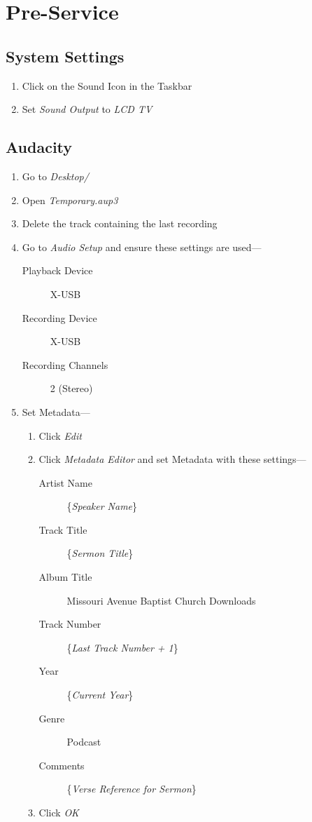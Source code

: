 \documentclass[12pt]{article}
\begin{document}
\section{Pre-Service}

    \subsection{System Settings}
    \begin{enumerate}
        \item Click on the Sound Icon in the Taskbar
        \item Set \emph{Sound Output} to \emph{LCD TV}
    \end{enumerate}

    \subsection{Audacity}
    \begin{enumerate}
        \item Go to \emph{Desktop/}
        \item Open \emph{Temporary.aup3}
        \item Delete the track containing the last recording
        \item Go to \emph{Audio Setup} and ensure these settings are used---
        \begin{description}
            \item [Playback Device] X-USB
            \item [Recording Device] X-USB
            \item [Recording Channels] 2 (Stereo)
        \end{description}
        \item Set Metadata---
        \begin{enumerate}
            \item Click \emph{Edit}
            \item Click \emph{Metadata Editor} and set Metadata with these settings---
            \begin{description}
                \item [Artist Name] \{\emph{Speaker Name}\}
                \item [Track Title] \{\emph{Sermon Title}\}
                \item [Album Title] Missouri Avenue Baptist Church Downloads
                \item [Track Number] \{\emph{Last Track Number + 1}\}
                \item [Year] \{\emph{Current Year}\}
                \item [Genre] Podcast
                \item [Comments] \{\emph{Verse Reference for Sermon}\}
            \end{description}
            \item Click \emph{OK}
        \end{enumerate}
    \end{enumerate}
\end{document}

